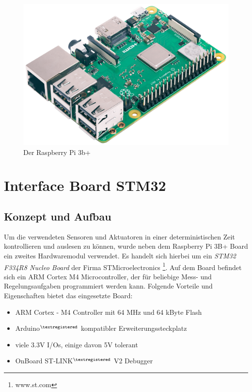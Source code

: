 \vspace{0.6cm}
\begin{figure}[hbtp]
\centering
\includegraphics[scale=0.1]{images/chapter4/raspberry.png}
\caption{Der Raspberry Pi 3b+ \cite{raspberry.2018}}
\label{fig:raspberry}
\end{figure}






\newpage
\section{Interface Board STM32}
\label{sec:InterfaceBoard}
\subsection{Konzept und Aufbau}

Um die verwendeten Sensoren und Aktuatoren in einer deterministischen Zeit kontrollieren und auslesen zu können, wurde neben dem Raspberry Pi 3B+ Board ein zweites Hardwaremodul verwendet. Es handelt sich hierbei um ein \textit{STM32 F334R8 Nucleo Board} der Firma STMicroelectronics \footnote{www.st.com}. Auf dem Board befindet sich ein ARM Cortex M4 Microcontroller, der für beliebige Mess- und Regelungsaufgaben programmiert werden kann. Folgende Vorteile und Eigenschaften bietet das eingesetzte Board:

\begin{itemize}
\item ARM Cortex - M4 Controller mit 64 MHz und 64 kByte Flash
\item Arduino$^{\textregistered}$ kompatibler Erweiterungssteckplatz
\item viele 3.3V I/Os, einige davon 5V tolerant
\item OnBoard ST-LINK$^{\textregistered}$ V2 Debugger
\end{itemize}

